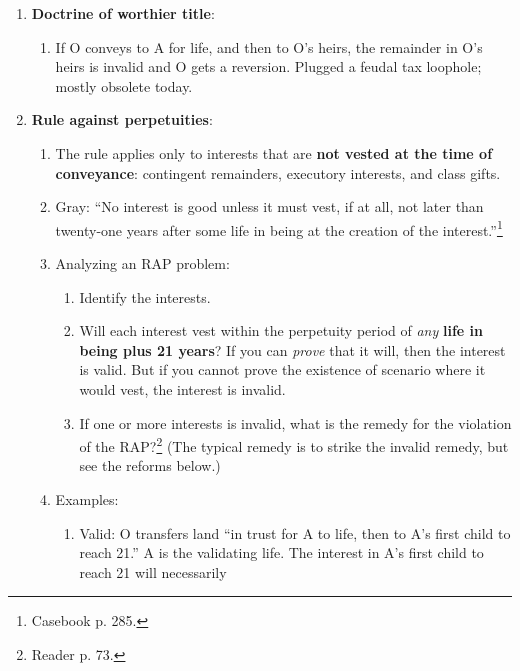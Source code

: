 \begin{enumerate}
\begin{enumerate}
\begin{enumerate}
        \end{enumerate}
        \item \textbf{Doctrine of worthier title}:
        \begin{enumerate}
            \item If O conveys to A for life, and then to O's heirs, the 
            remainder in O's heirs is invalid and O gets a reversion. Plugged 
            a feudal tax loophole; mostly obsolete today.
        \end{enumerate}
        \item \textbf{Rule against perpetuities}:
        \begin{enumerate}
            \item The rule applies only to interests that are \textbf{not 
            vested at the time of conveyance}: contingent remainders, 
            executory interests, and class gifts.
            \item Gray: ``No interest is good unless it must vest, if at all, 
            not later than twenty-one years after some life in being at the 
            creation of the interest.''\footnote{Casebook p. 285.}
            \item Analyzing an RAP problem:
            \begin{enumerate}
                \item Identify the interests.
                \item Will each interest vest within the perpetuity period of 
                \emph{any} \textbf{life in being plus 21 years}? If you can 
                \emph{prove} that it will, then the interest is valid. But if 
                you cannot prove the existence of scenario where it would 
                vest, the interest is invalid.
                \item If one or more interests is invalid, what is the remedy 
                for the violation of the RAP?\footnote{Reader p. 73.} (The 
                typical remedy is to strike the invalid remedy, but see the 
                reforms below.)
            \end{enumerate}
            \item Examples:
            \begin{enumerate}
                \item Valid: O transfers land ``in trust for A to life, then 
                to A's first child to reach 21.'' A is the validating life. 
                The interest in A's first child to reach 21 will necessarily 

\end{enumerate}
\end{enumerate}
\end{enumerate}
\end{enumerate}
